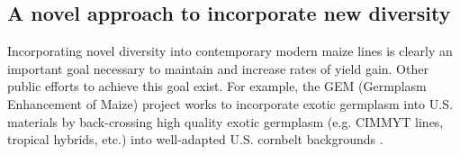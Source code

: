 \documentclass[12pt]{article}
\begin{document}

\subsection*{A novel approach to incorporate new diversity}

Incorporating novel diversity into contemporary modern maize lines is clearly an important goal necessary to maintain and increase rates of yield gain.
Other public efforts to achieve this goal exist.
For example, the GEM (Germplasm Enhancement of Maize) project works to incorporate exotic germplasm into U.S. materials by back-crossing high quality exotic germplasm (e.g. CIMMYT lines, tropical hybrids, etc.) into well-adapted U.S. cornbelt backgrounds \citep{pollak2003history}.
\end{document}
